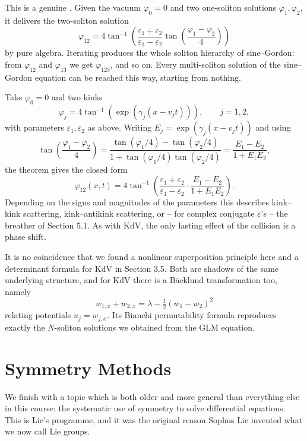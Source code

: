 This is a genuine . Given the vacuum $\varphi_0 = 0$ and two one-soliton solutions $\varphi_1, \varphi_2$, it delivers the two-soliton solution
$$
\varphi_{12} = 4\tan^{-1}\left(\frac{\varepsilon_1+\varepsilon_2}{\varepsilon_1-\varepsilon_2}\tan\left(\frac{\varphi_1-\varphi_2}{4}\right)\right)
$$
by pure algebra. Iterating produces the whole soliton hierarchy of sine--Gordon: from $\varphi_{12}$ and $\varphi_{13}$ we get $\varphi_{123}$, and so on. Every multi-soliton solution of the sine--Gordon equation can be reached this way, starting from nothing.

\begin{example}
	Take $\varphi_0 = 0$ and two kinks
	$$
	\varphi_j = 4\tan^{-1}\left(\exp\left(\gamma_j(x - v_jt)\right)\right), \qquad j = 1,2,
	$$
	with parameters $\varepsilon_1,\varepsilon_2$ as above. Writing $E_j = \exp(\gamma_j(x-v_jt))$ and using
	$$
	\tan\left(\frac{\varphi_1-\varphi_2}{4}\right) = \frac{\tan(\varphi_1/4) - \tan(\varphi_2/4)}{1 + \tan(\varphi_1/4)\tan(\varphi_2/4)} = \frac{E_1-E_2}{1+E_1E_2},
	$$
	the theorem gives the closed form
	$$
	\varphi_{12}(x,t) = 4\tan^{-1}\left(\frac{\varepsilon_1+\varepsilon_2}{\varepsilon_1-\varepsilon_2}\cdot\frac{E_1-E_2}{1+E_1E_2}\right).
	$$
	Depending on the signs and magnitudes of the parameters this describes kink--kink scattering, kink--antikink scattering, or -- for complex conjugate $\varepsilon$'s -- the breather of Section 5.1. As with KdV, the only lasting effect of the collision is a phase shift.
\end{example}

\begin{remark}
	It is no coincidence that we found a nonlinear superposition principle here and a determinant formula for KdV in Section 3.5. Both are shadows of the same underlying structure, and for KdV there is a B\"acklund transformation too, namely
	$$
	w_{1,x} + w_{2,x} = \lambda - \tfrac{1}{2}\left(w_1 - w_2\right)^2
	$$
	relating potentials $u_j = w_{j,x}$. Its Bianchi permutability formula reproduces exactly the $N$-soliton solutions we obtained from the GLM equation.
\end{remark}

\section{Symmetry Methods}

We finish with a topic which is both older and more general than everything else in this course: the systematic use of symmetry to solve differential equations. This is Lie's programme, and it was the original reason Sophus Lie invented what we now call Lie groups.

